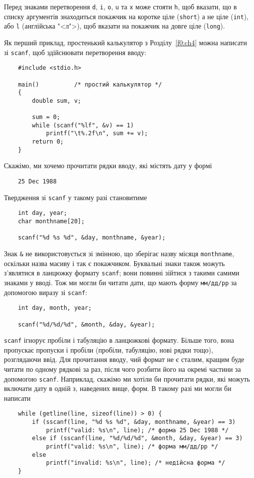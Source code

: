 \documentclass[a4paper,12pt]{book}
\begin{document}
  Перед знаками перетворення \texttt{d}, \texttt{i}, \texttt{o}, \texttt{u} та \texttt{x}
  може стояти \texttt{h}, щоб вказати, що в списку аргументів знаходиться покажчик на
  коротке ціле (\texttt{short}) а не ціле (\texttt{int}), або \texttt{l} (англійська
  "<л">), щоб вказати на покажчик на довге ціле (\texttt{long}).

  Як перший приклад, простенький калькулятор з Розділу~\ref{f0:ch4} можна написати
  зі \texttt{scanf}, щоб здійснювати перетворення вводу:
  \begin{verbatim}
    #include <stdio.h>

    main()          /* простий калькулятор */
    {
        double sum, v;

        sum = 0;
        while (scanf("%lf", &v) == 1)
            printf("\t%.2f\n", sum += v);
        return 0;
    }
  \end{verbatim}

  Скажімо, ми хочемо прочитати рядки вводу, які містять дату у формі
  \begin{verbatim}
    25 Dec 1988
  \end{verbatim}

  Твердження зі \texttt{scanf} у такому разі становитиме
  \begin{verbatim}
    int day, year;
    char monthname[20];

    scanf("%d %s %d", &day, monthname, &year);
  \end{verbatim}

  Знак \texttt{\&} не використовується зі змінною, що зберігає назву місяця
  \texttt{monthname}, оскільки назва масиву і так є покажчиком. Буквальні знаки також
  можуть з'являтися в ланцюжку формату \texttt{scanf}; вони повинні зійтися з такими
  самими знаками у вводі. Тож ми могли би читати дати, що мають форму \texttt{мм/дд/рр} за
  допомогою виразу зі \texttt{scanf}:
  \begin{verbatim}
    int day, month, year;

    scanf("%d/%d/%d", &month, &day, &year);
  \end{verbatim}

  \texttt{scanf} ігнорує пробіли і табуляцію в ланцюжкові формату. Більше того, вона
  пропускає пропуски і пробіли (пробіли, табуляцію, нові рядки тощо), розглядаючи ввід.
  Для прочитання вводу, чий формат не є сталим, кращим буде читати по одному рядкові за
  раз, після чого розбити його на окремі частини за допомогою \texttt{scanf}. Наприклад,
  скажімо ми хотіли би прочитати рядки, які можуть включати дату в одній з, наведених
  вище, форм. В такому разі ми могли би написати
  \begin{verbatim}
    while (getline(line, sizeof(line)) > 0) {
        if (sscanf(line, "%d %s %d", &day, monthname, &year) == 3)
            printf("valid: %s\n", line); /* форма 25 Dec 1988 */
        else if (sscanf(line, "%d/%d/%d", &month, &day, &year) == 3)
            printf("valid: %s\n", line); /* форма мм/дд/рр */
        else
            printf("invalid: %s\n", line); /* недійсна форма */
    }
  \end{verbatim}
\end{document}

